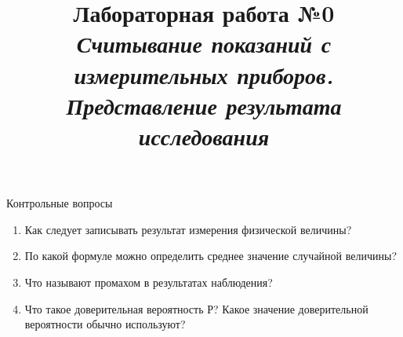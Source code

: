 \documentclass[14pt,a4paper]{article}
\title{Лабораторная работа №0 \\ \textit{Считывание показаний с измерительных приборов. Представление результата исследования}}
\begin{document}
\maketitle




Контрольные вопросы
\begin{enumerate}
    \item Как следует записывать результат измерения физической величины?
    \item По какой формуле можно определить среднее значение случайной величины?
    \item Что называют промахом в результатах наблюдения? 
    \item Что такое доверительная вероятность Р? Какое значение доверительной вероятности обычно используют? %
\end{enumerate} 

\end{document}

